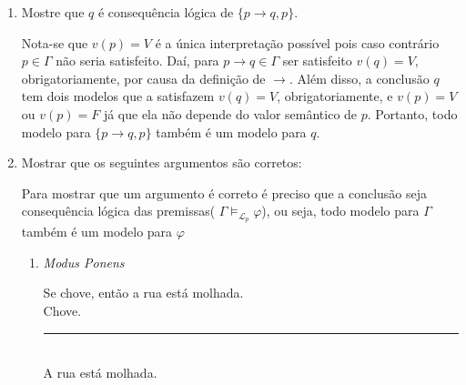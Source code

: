\begin{enumerate}[label=\arabic*., left=0.5cm, align=left, nosep]
\begin{enumerate}[label=(\alph*), left=0.5cm, align=left, nosep]
                    \item $\neg\neg \psi \Lpbimodels \psi$

                    Para $\neg\neg \psi$ o único modelo possível é $v(\psi) = V$, pela definição de $\neg$. Além disso, para
                    $\psi$ o único modelo possível é $v(\psi) = V$ pois caso contrário, $\psi \in \Gamma$ não seria satisfeita. 
                    Portanto, como todo modelo de para $\neg\neg \psi$ também é um modelo para $\psi$, as fórmulas são 
                    semanticamente equivalentes.

                \end{enumerate}
            
            \vspace{0.5cm}
            \item Mostre que $q$ é consequência lógica de $\{p \to q, p\}$.
                
                Nota-se que $v(p) = V$ é a única interpretação possível pois caso contrário $p \in \Gamma$ não seria satisfeito.
                Daí, para $p \to q \in \Gamma$ ser satisfeito $v(q) = V$, obrigatoriamente, por causa da definição de $\to$. Além
                disso, a conclusão $q$ tem dois modelos que a satisfazem $v(q) = V$, obrigatoriamente, e $v(p) = V$ ou $v(p) = F$
                já que ela não depende do valor semântico de $p$. Portanto, todo modelo para $\{p \to q, p\}$ também é um modelo para 
                $q$.
            
            \item Mostrar que os seguintes argumentos são corretos:
                
                Para mostrar que um argumento é correto é preciso que a conclusão seja 
                consequência lógica das premissas( $\Gamma \models_{\mathcal{L}_p} \varphi$), 
                ou seja, todo modelo para $\Gamma$ também é um modelo para $\varphi$
                
                \begin{enumerate}[label=(\alph*), left=0.5cm, align=left, nosep]
                    \item \textit{Modus Ponens}  
            
                        Se chove, então a rua está molhada.\\              
                        Chove. \\
                        \rule{7cm}{0.4pt}\\
                        A rua está molhada.
                        

\end{enumerate}
\end{enumerate}
